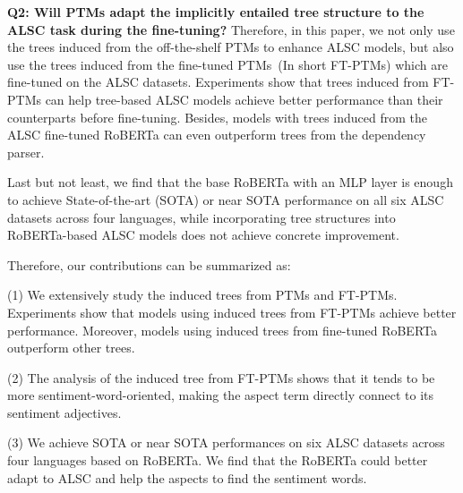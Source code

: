 \documentclass[11pt]{article}
\begin{document}
\textbf{Q2: Will PTMs adapt the implicitly entailed tree structure to the ALSC task during the fine-tuning?}
Therefore, in this paper, we not only use the trees  induced from the off-the-shelf PTMs to enhance ALSC models, but also use the trees induced from the fine-tuned PTMs~(In short FT-PTMs) which are fine-tuned on the ALSC datasets. Experiments show that trees induced from FT-PTMs can help tree-based ALSC models  achieve better performance than their counterparts before fine-tuning. Besides, models with trees induced from the ALSC fine-tuned RoBERTa can even outperform trees from the dependency parser.


Last but not least, we find that the base RoBERTa with an MLP layer is enough to achieve State-of-the-art (SOTA) or near SOTA performance on all six ALSC datasets across four languages, while incorporating tree structures into RoBERTa-based ALSC models does not achieve concrete improvement.


Therefore, our contributions can be summarized as:

(1) We extensively study the induced trees from  PTMs and FT-PTMs. Experiments show that models using induced trees from FT-PTMs achieve better performance. Moreover, models using induced trees from fine-tuned RoBERTa outperform  other trees.


(2) The analysis of the induced tree  from FT-PTMs shows that it tends to be more sentiment-word-oriented, making the aspect term directly connect to its sentiment adjectives.

(3) We achieve SOTA or near SOTA performances on six ALSC datasets across four languages based on RoBERTa. We find that the RoBERTa could better adapt to ALSC and help the aspects to find the sentiment words.
\end{document}
